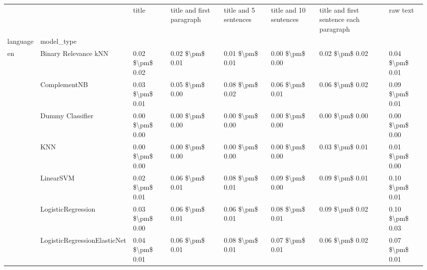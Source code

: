 \begin{tabular}{llllllll}
\toprule
   &         &            title & title and first paragraph & title and 5 sentences & title and 10 sentences & title and first sentence each paragraph &             raw text \\
language & model\_type &                  &                           &                       &                        &                                         &                      \\
\midrule
en & Binary Relevance kNN &  0.02 \$\textbackslash pm\$ 0.02 &           0.02 \$\textbackslash pm\$ 0.01 &       0.01 \$\textbackslash pm\$ 0.01 &        0.00 \$\textbackslash pm\$ 0.00 &                         0.02 \$\textbackslash pm\$ 0.02 &      0.04 \$\textbackslash pm\$ 0.01 \\
   & ComplementNB &  0.03 \$\textbackslash pm\$ 0.01 &           0.05 \$\textbackslash pm\$ 0.00 &       0.08 \$\textbackslash pm\$ 0.02 &        0.06 \$\textbackslash pm\$ 0.01 &                         0.06 \$\textbackslash pm\$ 0.02 &      0.09 \$\textbackslash pm\$ 0.01 \\
   & Dummy Classifier &  0.00 \$\textbackslash pm\$ 0.00 &           0.00 \$\textbackslash pm\$ 0.00 &       0.00 \$\textbackslash pm\$ 0.00 &        0.00 \$\textbackslash pm\$ 0.00 &                         0.00 \$\textbackslash pm\$ 0.00 &      0.00 \$\textbackslash pm\$ 0.00 \\
   & KNN &  0.00 \$\textbackslash pm\$ 0.00 &           0.00 \$\textbackslash pm\$ 0.00 &       0.00 \$\textbackslash pm\$ 0.00 &        0.00 \$\textbackslash pm\$ 0.00 &                         0.03 \$\textbackslash pm\$ 0.01 &      0.01 \$\textbackslash pm\$ 0.00 \\
   & LinearSVM &  0.02 \$\textbackslash pm\$ 0.01 &           0.06 \$\textbackslash pm\$ 0.01 &       0.08 \$\textbackslash pm\$ 0.01 &        0.09 \$\textbackslash pm\$ 0.00 &                         0.09 \$\textbackslash pm\$ 0.01 &      0.10 \$\textbackslash pm\$ 0.01 \\
   & LogisticRegression &  0.03 \$\textbackslash pm\$ 0.00 &           0.06 \$\textbackslash pm\$ 0.01 &       0.06 \$\textbackslash pm\$ 0.01 &        0.08 \$\textbackslash pm\$ 0.01 &                         0.09 \$\textbackslash pm\$ 0.02 &      0.10 \$\textbackslash pm\$ 0.03 \\
   & LogisticRegressionElasticNet &  0.04 \$\textbackslash pm\$ 0.01 &           0.06 \$\textbackslash pm\$ 0.01 &       0.08 \$\textbackslash pm\$ 0.01 &        0.07 \$\textbackslash pm\$ 0.01 &                         0.06 \$\textbackslash pm\$ 0.02 &      0.07 \$\textbackslash pm\$ 0.01 \\

\end{tabular}
